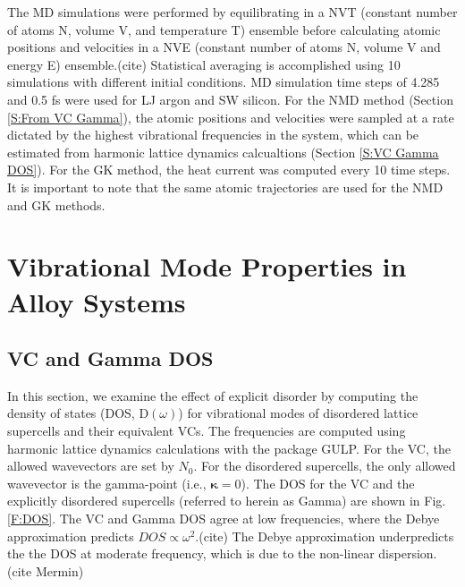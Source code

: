 \documentclass[aps,prb,twocolumn,superscriptaddress,amsmath,amssymb,floatfix]{revtex4}
\begin{document}
The MD simulations were performed by equilibrating in a NVT (constant 
number of atoms N, volume V, and temperature T) ensemble before 
calculating atomic positions and velocities in a NVE 
(constant number of 
atoms N, volume V and energy E) ensemble.(cite)  
Statistical averaging is accomplished 
using 10 simulations with different initial conditions. MD simulation 
time steps of 
4.285 and 0.5 fs were used for LJ argon and SW silicon. 
For the NMD method (Section \ref{S:From VC Gamma}), 
the atomic positions 
and velocities were sampled at a rate dictated by the highest vibrational 
frequencies in the system, which can be estimated from harmonic lattice 
dynamics calcualtions (Section \ref{S:VC Gamma DOS}). 
For the GK method, the heat current 
was computed every 10 time steps. It is important to note that the same 
atomic trajectories are used for the NMD and GK methods. 

\section{\label{S:Vibrational}
Vibrational Mode Properties in Alloy Systems}

\subsection{\label{S:VC Gamma DOS}VC and Gamma DOS}

In this section, we examine the effect of explicit disorder by computing 
the density of states (DOS, D$(\omega)$) for vibrational modes of  
disordered lattice supercells and their 
equivalent VCs. The frequencies 
are computed using harmonic lattice dynamics calculations with the package 
GULP.\cite{gale_general_2003} For the 
VC, the allowed wavevectors are set by $N_0$. For the disordered 
supercells,
the only allowed wavevector is the gamma-point (i.e., $\pmb{\kappa}=0$). 
The DOS for the VC and the explicitly disordered supercells 
(referred to herein as Gamma) are shown in Fig. \ref{F:DOS}. 
The VC and Gamma DOS 
agree at low frequencies, where the Debye approximation predicts 
$DOS \propto \omega^2$.(cite) The Debye approximation 
underpredicts the the DOS at moderate frequency, which is due to the 
non-linear dispersion.(cite Mermin)
\end{document}
